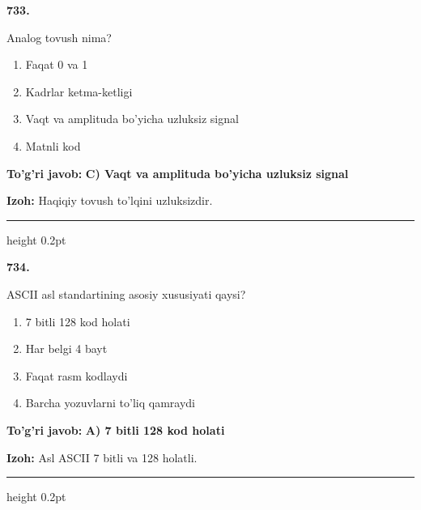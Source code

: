 \documentclass[10pt,a4paper,oneside]{article}
\begin{document}
\noindent\textbf{\color{ink}733.}
\par
Analog tovush nima?
\begin{enumerate}[label=\Alph*),leftmargin=9mm]
\item Faqat 0 va 1
\item Kadrlar ketma-ketligi
\item Vaqt va amplituda bo'yicha uzluksiz signal
\item Matnli kod
\end{enumerate}
\begin{tcolorbox}[enhanced,breakable,colback=teal!4,colframe=teal!50!black,boxrule=0.5pt,arc=1.1mm,left=3mm,right=3mm,top=1.7mm,bottom=1.7mm,before skip=2mm,after skip=2mm]
\textbf{\color{teal}To'g'ri javob:} \textbf{C) Vaqt va amplituda bo'yicha uzluksiz signal}
\par\smallskip
\textbf{Izoh:} Haqiqiy tovush to'lqini uzluksizdir.
\end{tcolorbox}
\vspace{2mm}\hrule height 0.2pt \vspace{3mm}

\noindent\textbf{\color{ink}734.}
\par
ASCII asl standartining asosiy xususiyati qaysi?
\begin{enumerate}[label=\Alph*),leftmargin=9mm]
\item 7 bitli 128 kod holati
\item Har belgi 4 bayt
\item Faqat rasm kodlaydi
\item Barcha yozuvlarni to'liq qamraydi
\end{enumerate}
\begin{tcolorbox}[enhanced,breakable,colback=teal!4,colframe=teal!50!black,boxrule=0.5pt,arc=1.1mm,left=3mm,right=3mm,top=1.7mm,bottom=1.7mm,before skip=2mm,after skip=2mm]
\textbf{\color{teal}To'g'ri javob:} \textbf{A) 7 bitli 128 kod holati}
\par\smallskip
\textbf{Izoh:} Asl ASCII 7 bitli va 128 holatli.
\end{tcolorbox}
\vspace{2mm}\hrule height 0.2pt \vspace{3mm}
\end{document}
